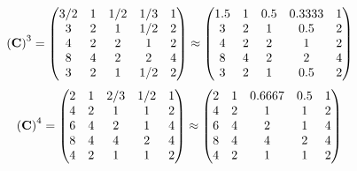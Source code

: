 \documentclass[10pt,a4paper]{article}
\begin{document}
	\[
		\left(\bold{C}\right)^{3} = 
		\begin{pmatrix}
			{{3}} / {{2}} & {1}{} & {1} / {{2}} & {1} / {{3}} & {1}{} \\
			{{3}}{} & {{2}}{} & {1}{} & {1} / {{2}} & {{2}}{} \\
			{{4}}{} & {{2}}{} & {{2}}{} & {1}{} & {{2}}{} \\
			{{8}}{} & {{4}}{} & {{2}}{} & {{2}}{} & {{4}}{} \\
			{{3}}{} & {{2}}{} & {1}{} & {1} / {{2}} & {{2}}{} \\
		\end{pmatrix}
		\approx
		\begin{pmatrix}
			1.5      & 1        & 0.5      & 0.3333   & 1        \\
			3        & 2        & 1        & 0.5      & 2        \\
			4        & 2        & 2        & 1        & 2        \\
			8        & 4        & 2        & 2        & 4        \\
			3        & 2        & 1        & 0.5      & 2        \\
		\end{pmatrix}
	\]
	\[
		\left(\bold{C}\right)^{4} = 
		\begin{pmatrix}
			{{2}}{} & {1}{} & {{2}} / {{3}} & {1} / {{2}} & {1}{} \\
			{{4}}{} & {{2}}{} & {1}{} & {1}{} & {{2}}{} \\
			{{6}}{} & {{4}}{} & {{2}}{} & {1}{} & {{4}}{} \\
			{{8}}{} & {{4}}{} & {{4}}{} & {{2}}{} & {{4}}{} \\
			{{4}}{} & {{2}}{} & {1}{} & {1}{} & {{2}}{} \\
		\end{pmatrix}
		\approx
		\begin{pmatrix}
			2        & 1        & 0.6667   & 0.5      & 1        \\
			4        & 2        & 1        & 1        & 2        \\
			6        & 4        & 2        & 1        & 4        \\
			8        & 4        & 4        & 2        & 4        \\
			4        & 2        & 1        & 1        & 2        \\
		\end{pmatrix}
	\]
\end{document}
